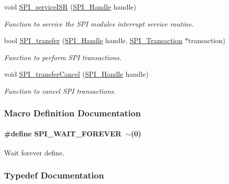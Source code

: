\begin{DoxyCompactItemize}
void \hyperlink{_s_p_i_8h_aa6f1baa732ebbf0aa7cd5c3f7dfd215a}{S\+P\+I\+\_\+service\+I\+S\+R} (\hyperlink{_s_p_i_8h_a728806534c3c3e8675cfbfb7d8e36f13}{S\+P\+I\+\_\+\+Handle} handle)
\begin{DoxyCompactList}\small\item\em Function to service the S\+P\+I module\textquotesingle{}s interrupt service routine. \end{DoxyCompactList}\item 
bool \hyperlink{_s_p_i_8h_a989e17f96b54fcc3dc2cac5f8ac6bdb2}{S\+P\+I\+\_\+transfer} (\hyperlink{_s_p_i_8h_a728806534c3c3e8675cfbfb7d8e36f13}{S\+P\+I\+\_\+\+Handle} handle, \hyperlink{struct_s_p_i___transaction}{S\+P\+I\+\_\+\+Transaction} $\ast$transaction)
\begin{DoxyCompactList}\small\item\em Function to perform S\+P\+I transactions. \end{DoxyCompactList}\item 
void \hyperlink{_s_p_i_8h_a6819f7761fc3505c4f885653ff8121f0}{S\+P\+I\+\_\+transfer\+Cancel} (\hyperlink{_s_p_i_8h_a728806534c3c3e8675cfbfb7d8e36f13}{S\+P\+I\+\_\+\+Handle} handle)
\begin{DoxyCompactList}\small\item\em Function to cancel S\+P\+I transactions. \end{DoxyCompactList}\end{DoxyCompactItemize}


\subsubsection{Macro Definition Documentation}
\paragraph[{S\+P\+I\+\_\+\+W\+A\+I\+T\+\_\+\+F\+O\+R\+E\+V\+E\+R}]{\setlength{\rightskip}{0pt plus 5cm}\#define S\+P\+I\+\_\+\+W\+A\+I\+T\+\_\+\+F\+O\+R\+E\+V\+E\+R~$\sim$(0)}\label{_s_p_i_8h_a7cab73b936e6e08392882196df41277e}


Wait forever define. 



\subsubsection{Typedef Documentation}
